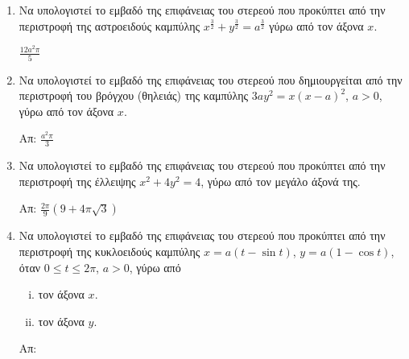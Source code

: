 


\everymath{\displaystyle}
\thispagestyle{empty}



\begin{center}
\end{center}

\vspace{\baselineskip}


\begin{enumerate}

\item Να υπολογιστεί το εμβαδό της επιφάνειας του στερεού που προκύπτει από την
	περιστροφή της αστροειδούς καμπύλης $ x^{\frac{3}{2}} + y^{\frac{3}{2}} = a^{\frac{3}{2}
	} $ γύρω από τον άξονα $x$. 

	\hfill $ \frac{12 a^{2}\pi}{5}  $ 

\item Να υπολογιστεί το εμβαδό της επιφάνειας του στερεού που δημιουργείται από την περιστροφή του
	βρόγχου (θηλειάς) της καμπύλης $ 3ay^{2} = x(x-a)^{2} $, $ a>0 $, γύρω από τον άξονα $x$.

\hfill Απ: $ \frac{a^{2} \pi}{3}  $

\item Να υπολογιστεί το εμβαδό της επιφάνειας του στερεού που προκύπτει από την περιστροφή της
	έλλειψης $ x^{2} + 4y^{2} = 4 $, γύρω από τον μεγάλο άξονά της.

	\hfill Απ: $ \frac{2 \pi}{9} (9 + 4 \pi \sqrt{3}) $

\item Να υπολογιστεί το εμβαδό της επιφάνειας του στερεού που προκύπτει από την περιστροφή της
	κυκλοειδούς καμπύλης $ x = a (t - \sin{t}) $, $ y = a(1 - \cos{t}) $, όταν $ 0 \leq t \leq 2 \pi
	$, $ a>0 $, γύρω από
	\begin{enumerate}[i)]
	\item 	τον άξονα $x$.
	\item τον άξονα $y$.
\end{enumerate}	

\hfill Απ:  
		 
\end{enumerate}


